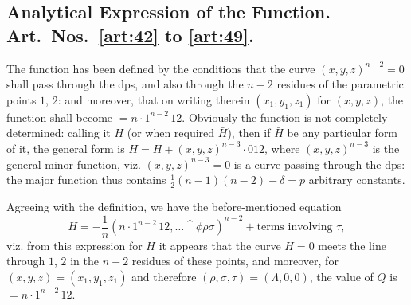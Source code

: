 \documentclass[11pt,a4paper]{book}
\begin{document}
\subsection*{Analytical Expression of the Function. Art.~Nos.~\ref{art:42} to \ref{art:49}.}

\begin{art}\label{art:42}
The function has been defined by the conditions that the curve $(x, y, z)^{n-2} = 0$ shall pass through the dps, and also through the $n-2$ residues of the parametric points $1$, $2$: and moreover, that on writing therein $(x_1, y_1, z_1)$ for $(x, y, z)$, the function shall become $= n \cdot 1^{n-2}\,12$. Obviously the function is not completely determined: calling it $H$ (or when required $\bar{H}$), then if $\bar{H}$ be any particular form of it, the general form is $H = \bar{H} + (x, y, z)^{n-3} \cdot 012$, where $(x, y, z)^{n-3}$ is the general minor function, viz. $(x, y, z)^{n-3} = 0$ is a curve passing through the dps: the major function thus contains $\frac{1}{2}(n-1)(n-2) - \delta = p$ arbitrary constants.

Agreeing with the definition, we have the before-mentioned equation
\[
H = -\frac{1}{n}(n \cdot 1^{n-2}\,12, \ldots \uparrow\phi\rho\sigma)^{n-2} + \text{terms involving } \tau,
\]
viz. from this expression for $H$ it appears that the curve $H = 0$ meets the line through $1$, $2$ in the $n-2$ residues of these points, and moreover, for $(x, y, z) = (x_1, y_1, z_1)$ and therefore $(\rho, \sigma, \tau) = (\Lambda, 0, 0)$, the value of $Q$ is $= n \cdot 1^{n-2}\,12$.
\end{art}
\end{document}
